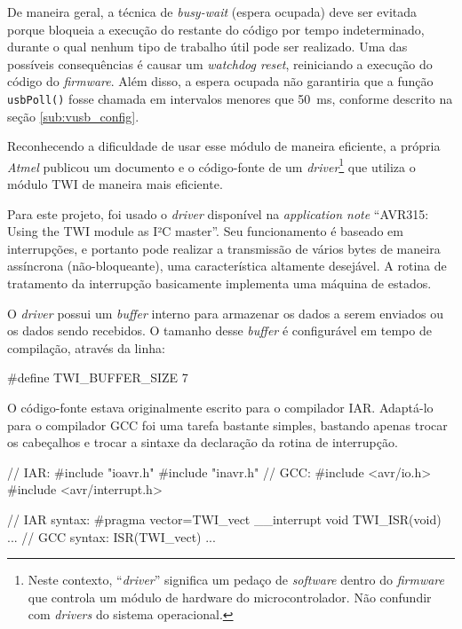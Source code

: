 \documentclass[brazil,pagestart=firstchapter]{abnt}
\begin{document}
De maneira geral, a técnica de \textit{busy-wait} (espera ocupada) deve
ser evitada porque bloqueia a execução do restante do código por tempo
indeterminado, durante o qual nenhum tipo de trabalho útil pode ser
realizado. Uma das possíveis consequências é causar um \textit{watchdog
reset}, reiniciando a execução do código do \textit{firmware}. Além disso,
a espera ocupada não garantiria que a função \texttt{usbPoll()} fosse
chamada em intervalos menores que \SI{50}{\milli\second}, conforme descrito
na seção \ref{sub:vusb_config}.

Reconhecendo a dificuldade de usar esse módulo de maneira eficiente, a
própria \textit{Atmel} publicou um documento e o código-fonte de um
\textit{driver}\footnote{
	Neste contexto, ``\textit{driver}'' significa um pedaço de
	\textit{software} dentro do \textit{firmware} que controla um módulo de
	hardware do microcontrolador. Não confundir com \textit{drivers} do
	sistema operacional.}
que utiliza o módulo \ac{TWI} de maneira mais eficiente. \cite{AVR315}

Para este projeto, foi usado o \textit{driver} disponível na
\textit{application note} ``AVR315: Using the TWI module as I²C master''.
Seu funcionamento é baseado em interrupções, e portanto pode realizar a
transmissão de vários bytes de maneira assíncrona (não-bloqueante), uma
característica altamente desejável. A rotina de tratamento da interrupção
basicamente implementa uma máquina de estados. \cite[p.~13]{AVR315}

O \textit{driver} possui um \textit{buffer} interno para armazenar os dados
a serem enviados ou os dados sendo recebidos. O tamanho desse
\textit{buffer} é configurável em tempo de compilação, através da linha:

\begin{ccode}[numbers=none]
#define TWI_BUFFER_SIZE     7
\end{ccode}

O código-fonte estava originalmente escrito para o compilador IAR. Adaptá-lo
para o compilador GCC foi uma tarefa bastante simples, bastando apenas
trocar os cabeçalhos e trocar a sintaxe da declaração da rotina de
interrupção. \cite{avrlibcporting}

\begin{ccode}[numbers=none, multicols=2, float=h]
// IAR:
#include "ioavr.h"
#include "inavr.h"
// GCC:
#include <avr/io.h>
#include <avr/interrupt.h>
\end{ccode}

\begin{ccode}[numbers=none, multicols=2, float=h]
// IAR syntax:
#pragma vector=TWI_vect
__interrupt void TWI_ISR(void)
{
  ...
}
// GCC syntax:
ISR(TWI_vect)
{
  ...
}

\end{ccode}
\end{document}
